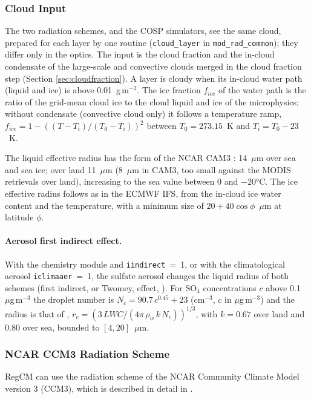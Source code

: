 \subsubsection{Cloud Input}

The two radiation schemes, and the COSP simulators, see the same cloud,
prepared for each layer by one routine (\texttt{cloud\_layer} in
\texttt{mod\_rad\_common}); they differ only in the optics.  The input is
the cloud fraction and the in-cloud condensate of the large-scale and
convective clouds merged in the cloud fraction step (Section
\ref{sec:cloudfraction}).  A layer is cloudy when its in-cloud water path
(liquid and ice) is above 0.01~g\,m$^{-2}$.  The ice fraction $f_{ice}$ of
the water path is the ratio of the grid-mean cloud ice to the cloud liquid
and ice of the microphysics; without condensate (convective cloud only) it
follows a temperature ramp, $f_{ice} = 1-((T-T_i)/(T_0-T_i))^2$ between
$T_0 = 273.15$~K and $T_i = T_0-23$~K.

The liquid effective radius has the form of the NCAR CAM3
\citep{Collins_04}: 14~$\mu$m over sea and sea ice; over land 11~$\mu$m
(8~$\mu$m in CAM3, too small against the MODIS retrievals over land),
increasing to the sea value between 0 and $-20$°C.  The ice effective radius follows
\cite{Sun_01} as in the ECMWF IFS, from the in-cloud ice water content and the
temperature, with a minimum size of $20+40\cos\phi$~$\mu$m at latitude
$\phi$.

\paragraph{Aerosol first indirect effect.}
With the chemistry module and \texttt{iindirect}~=~1, or with the
climatological aerosol \texttt{iclimaaer}~=~1, the sulfate aerosol changes
the liquid radius of both schemes (first indirect, or Twomey, effect,
\citealt{Qian_01}).  For SO$_4$ concentrations $c$ above
0.1~$\mu$g\,m$^{-3}$ the droplet number is $N_c = 90.7\,c^{0.45} + 23$
(cm$^{-3}$, $c$ in $\mu$g\,m$^{-3}$) and the radius is that of
\cite{Martin_94}, $r_e = (3\,LWC / (4\pi\,\rho_w\,k\,N_c))^{1/3}$, with
$k = 0.67$ over land and $0.80$ over sea, bounded to $[4, 20]$~$\mu$m.

\subsubsection{NCAR CCM3 Radiation Scheme}

\ac{RegCM} can use the radiation scheme of the \ac{NCAR} Community Climate
Model version 3 (CCM3), which is described in detail in \cite{Kiehl_96}.

